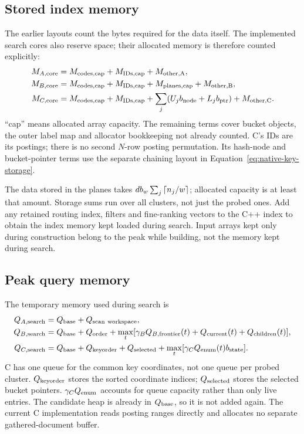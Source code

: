 \subsection{Stored index memory}
The earlier layouts count the bytes required for the data itself. The implemented search
cores also reserve space; their allocated memory is therefore counted explicitly:
\begin{align}
M_{A,\rm core}&=M_{\rm codes,cap}+M_{\rm IDs,cap}+M_{\rm other,A},\label{eq:final-storageA}\\
M_{B,\rm core}&=M_{\rm codes,cap}+M_{\rm IDs,cap}+M_{\rm planes,cap}
 +M_{\rm other,B},\label{eq:final-storageB}\\
M_{C,\rm core}&=M_{\rm codes,cap}+M_{\rm IDs,cap}
 +\sum_j(U_jb_{\rm node}+L_jb_{\rm ptr})+M_{\rm other,C}.
\label{eq:final-storageC}
\end{align}
``cap'' means allocated array capacity. The remaining terms cover bucket objects, the outer
label map and allocator bookkeeping not already counted. C's IDs are its postings; there is
no second $N$-row posting permutation. Its hash-node and bucket-pointer terms use the separate
chaining layout in Equation~\eqref{eq:native-key-storage}.

The data stored in the planes takes $d b_w\sum_j\left\lceil n_j/w\right\rceil$; allocated capacity is at least that amount.
Storage sums run over all clusters, not just the probed ones. Add any retained routing index,
filters and fine-ranking vectors to the C++ index to obtain the index memory kept loaded during search. Input arrays
kept only during construction belong to the peak while building, not the memory kept during search.

\subsection{Peak query memory}

The temporary memory used during search is
\begin{align}
Q_{A,\rm search}&=Q_{\mathrm{base}}+Q_{\rm scan\ workspace},\\
Q_{B,\rm search}&=Q_{\mathrm{base}}+Q_{\rm order}
 +\max_t[\gamma_B Q_{B,\rm frontier}(t)+Q_{\rm current}(t)+Q_{\rm children}(t)],\\
Q_{C,\rm search}&=Q_{\mathrm{base}}+Q_{\rm keyorder}+Q_{\rm selected}
 +\max_t[\gamma_C Q_{\rm enum}(t)b_{\rm state}].
\end{align}
C has one queue for the common key coordinates, not one queue per probed cluster.
$Q_{\rm keyorder}$ stores the sorted coordinate indices; $Q_{\rm selected}$ stores the selected
bucket pointers. $\gamma_C Q_{\rm enum}$ accounts for queue capacity rather than only live entries.
The candidate heap is already in $Q_{\mathrm{base}}$, so it is not added again. The current C implementation
reads posting ranges directly and allocates no separate gathered-document buffer.

